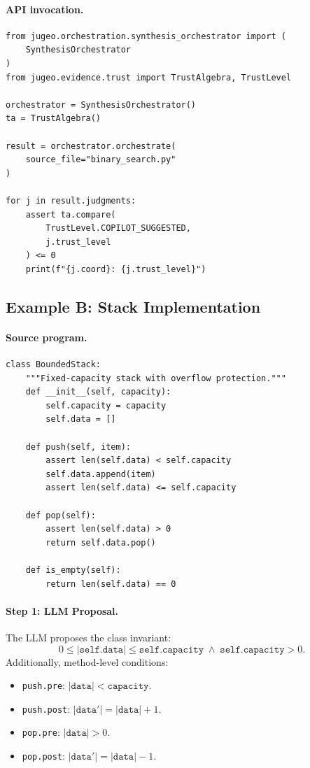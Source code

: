 \documentclass[11pt]{article}
\begin{document}
\paragraph{API invocation.}
\begin{lstlisting}[style=jugeo-python]
from jugeo.orchestration.synthesis_orchestrator import (
    SynthesisOrchestrator
)
from jugeo.evidence.trust import TrustAlgebra, TrustLevel

orchestrator = SynthesisOrchestrator()
ta = TrustAlgebra()

result = orchestrator.orchestrate(
    source_file="binary_search.py"
)

for j in result.judgments:
    assert ta.compare(
        TrustLevel.COPILOT_SUGGESTED,
        j.trust_level
    ) <= 0
    print(f"{j.coord}: {j.trust_level}")
\end{lstlisting}

\subsection{Example B: Stack Implementation}

\paragraph{Source program.}
\begin{lstlisting}[style=jugeo-python]
class BoundedStack:
    """Fixed-capacity stack with overflow protection."""
    def __init__(self, capacity):
        self.capacity = capacity
        self.data = []

    def push(self, item):
        assert len(self.data) < self.capacity
        self.data.append(item)
        assert len(self.data) <= self.capacity

    def pop(self):
        assert len(self.data) > 0
        return self.data.pop()

    def is_empty(self):
        return len(self.data) == 0
\end{lstlisting}

\paragraph{Step 1: LLM Proposal.}
The LLM proposes the class invariant:
\[
  0 \le |\mathtt{self.data}| \le \mathtt{self.capacity}
  \;\land\; \mathtt{self.capacity} > 0.
\]
Additionally, method-level conditions:
\begin{itemize}[noitemsep]
  \item \texttt{push.pre}: $|\mathtt{data}| < \mathtt{capacity}$.
  \item \texttt{push.post}: $|\mathtt{data'}| = |\mathtt{data}| + 1$.
  \item \texttt{pop.pre}: $|\mathtt{data}| > 0$.
  \item \texttt{pop.post}: $|\mathtt{data'}| = |\mathtt{data}| - 1$.
\end{itemize}
\end{document}

